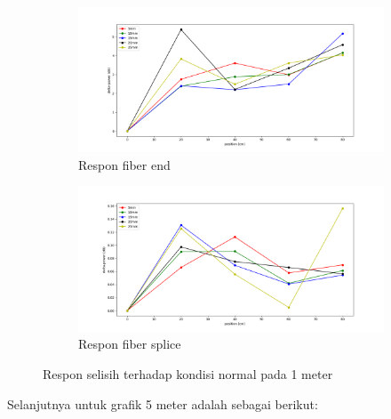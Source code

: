 \documentclass[12pt]{article}
\begin{document}
	\begin{figure}[h!]
		\centering
		\captionsetup{justification=centering}
		\begin{subfigure}[b]{0.6\textwidth}
			\includegraphics[width=\textwidth]{images/Bab_4/Bab_4_5f1}	
			\caption{\small{Respon fiber end}}		
		\end{subfigure}
		\begin{subfigure}[b]{0.6\textwidth}
			\includegraphics[width=\linewidth]{images/Bab_4/Bab_4_5f2}
			\caption{\small{Respon fiber splice}}			
		\end{subfigure}
		\caption[Uji Pagar]{\small{Respon selisih terhadap kondisi normal pada 1 meter}}
	\end{figure}

	Selanjutnya untuk grafik 5 meter adalah sebagai berikut:
	
\end{document}
